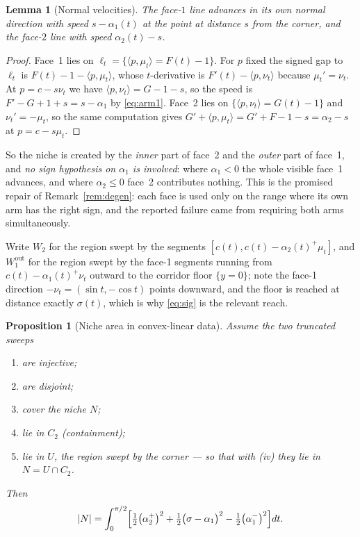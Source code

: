 \documentclass[11pt]{article}
\newtheorem{lemma}[theorem]{Lemma}
\newtheorem{proposition}[theorem]{Proposition}
\theoremstyle{definition}
\begin{document}
\begin{lemma}[Normal velocities]\label{lem:normvel}
The face-$1$ line advances in its own normal direction with speed $s-\alpha_1(t)$
at the point at distance $s$ from the corner, and the face-$2$ line with speed
$\alpha_2(t)-s$.
\end{lemma}

\begin{proof}
Face~1 lies on $\ell_t=\{\langle p,\mu_t\rangle=F(t)-1\}$. For $p$ fixed the
signed gap to $\ell_t$ is $F(t)-1-\langle p,\mu_t\rangle$, whose $t$-derivative is
$F'(t)-\langle p,\nu_t\rangle$ because $\mu_t'=\nu_t$. At $p=c-s\nu_t$ we have
$\langle p,\nu_t\rangle=G-1-s$, so the speed is $F'-G+1+s=s-\alpha_1$ by
\eqref{eq:arm1}. Face~2 lies on $\{\langle p,\nu_t\rangle=G(t)-1\}$ and
$\nu_t'=-\mu_t$, so the same computation gives $G'+\langle p,\mu_t\rangle
=G'+F-1-s=\alpha_2-s$ at $p=c-s\mu_t$.
\end{proof}

So the niche is created by the \emph{inner} part of face~2 and the \emph{outer}
part of face~1, and \emph{no sign hypothesis on $\alpha_1$ is involved}: where
$\alpha_1<0$ the whole visible face~1 advances, and where $\alpha_2\le0$ face~2
contributes nothing. This is the promised repair of Remark~\ref{rem:degen}: each
face is used only on the range where its own arm has the right sign, and the
reported failure came from requiring both arms simultaneously.

Write $W_2$ for the region swept by the segments $[c(t),c(t)-\alpha_2(t)^+\mu_t]$,
and $W_1^{\mathrm{out}}$ for the region swept by the face-1 segments running from
$c(t)-\alpha_1(t)^+\nu_t$ outward to the corridor floor $\{y=0\}$; note the face-1
direction $-\nu_t=(\sin t,-\cos t)$ points downward, and the floor is reached at
distance exactly $\sigma(t)$, which is why \eqref{eq:sig} is the relevant reach.

\begin{proposition}[Niche area in convex-linear data]\label{prop:V}
Assume the two truncated sweeps
\begin{enumerate}
\item[(i)] are injective;
\item[(ii)] are disjoint;
\item[(iii)] cover the niche $N$;
\item[(iv)] lie in $C_2$ \emph{(containment)};
\item[(v)] lie in $U$, the region swept by the corner --- so that with (iv) they lie in
$N=U\cap C_2$.
\end{enumerate}
Then
\begin{equation}\label{eq:V}
  |N|=\int_0^{\pi/2}\Bigl[\tfrac12\bigl(\alpha_2^+\bigr)^2
      +\tfrac12\bigl(\sigma-\alpha_1\bigr)^2
      -\tfrac12\bigl(\alpha_1^-\bigr)^2\Bigr]dt .
\end{equation}
\end{proposition}
\end{document}
